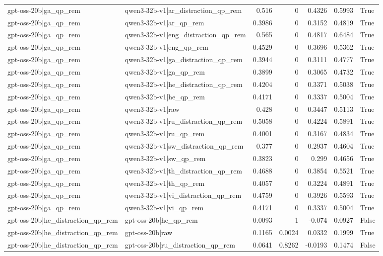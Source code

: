 \begin{table}
\begin{tabular}{l l r r r r l}
gpt-oss-20b|ga_qp_rem & qwen3-32b-v1|ar_distraction_qp_rem & 0.516 & 0 & 0.4326 & 0.5993 & True \\
gpt-oss-20b|ga_qp_rem & qwen3-32b-v1|ar_qp_rem & 0.3986 & 0 & 0.3152 & 0.4819 & True \\
gpt-oss-20b|ga_qp_rem & qwen3-32b-v1|eng_distraction_qp_rem & 0.565 & 0 & 0.4817 & 0.6484 & True \\
gpt-oss-20b|ga_qp_rem & qwen3-32b-v1|eng_qp_rem & 0.4529 & 0 & 0.3696 & 0.5362 & True \\
gpt-oss-20b|ga_qp_rem & qwen3-32b-v1|ga_distraction_qp_rem & 0.3944 & 0 & 0.3111 & 0.4777 & True \\
gpt-oss-20b|ga_qp_rem & qwen3-32b-v1|ga_qp_rem & 0.3899 & 0 & 0.3065 & 0.4732 & True \\
gpt-oss-20b|ga_qp_rem & qwen3-32b-v1|he_distraction_qp_rem & 0.4204 & 0 & 0.3371 & 0.5038 & True \\
gpt-oss-20b|ga_qp_rem & qwen3-32b-v1|he_qp_rem & 0.4171 & 0 & 0.3337 & 0.5004 & True \\
gpt-oss-20b|ga_qp_rem & qwen3-32b-v1|raw & 0.428 & 0 & 0.3447 & 0.5113 & True \\
gpt-oss-20b|ga_qp_rem & qwen3-32b-v1|ru_distraction_qp_rem & 0.5058 & 0 & 0.4224 & 0.5891 & True \\
gpt-oss-20b|ga_qp_rem & qwen3-32b-v1|ru_qp_rem & 0.4001 & 0 & 0.3167 & 0.4834 & True \\
gpt-oss-20b|ga_qp_rem & qwen3-32b-v1|sw_distraction_qp_rem & 0.377 & 0 & 0.2937 & 0.4604 & True \\
gpt-oss-20b|ga_qp_rem & qwen3-32b-v1|sw_qp_rem & 0.3823 & 0 & 0.299 & 0.4656 & True \\
gpt-oss-20b|ga_qp_rem & qwen3-32b-v1|th_distraction_qp_rem & 0.4688 & 0 & 0.3854 & 0.5521 & True \\
gpt-oss-20b|ga_qp_rem & qwen3-32b-v1|th_qp_rem & 0.4057 & 0 & 0.3224 & 0.4891 & True \\
gpt-oss-20b|ga_qp_rem & qwen3-32b-v1|vi_distraction_qp_rem & 0.4759 & 0 & 0.3926 & 0.5593 & True \\
gpt-oss-20b|ga_qp_rem & qwen3-32b-v1|vi_qp_rem & 0.4171 & 0 & 0.3337 & 0.5004 & True \\
gpt-oss-20b|he_distraction_qp_rem & gpt-oss-20b|he_qp_rem & 0.0093 & 1 & -0.074 & 0.0927 & False \\
gpt-oss-20b|he_distraction_qp_rem & gpt-oss-20b|raw & 0.1165 & 0.0024 & 0.0332 & 0.1999 & True \\
gpt-oss-20b|he_distraction_qp_rem & gpt-oss-20b|ru_distraction_qp_rem & 0.0641 & 0.8262 & -0.0193 & 0.1474 & False \\

\end{tabular}
\end{table}
